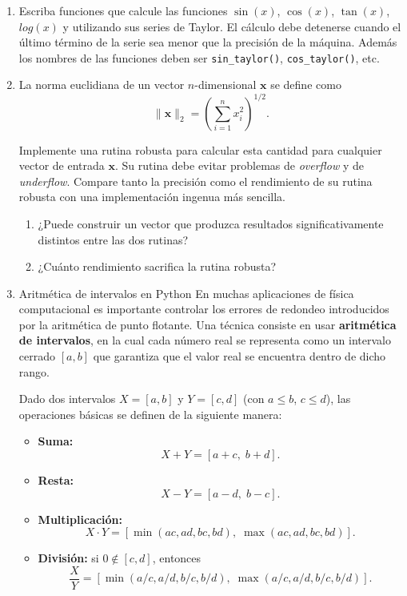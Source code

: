 \documentclass[12pt]{article}
\begin{document}
\begin{enumerate}[label=\textbf{\arabic*.}]
  \item   
  Escriba funciones que calcule las funciones $\sin(x)$, $\cos(x)$, $\tan(x)$, $log(x)$ y   utilizando sus series de Taylor.  
  El cálculo debe detenerse cuando el último término de la serie sea menor que la precisión de la máquina. Además los nombres de las funciones deben ser \texttt{sin\_taylor()}, \texttt{cos\_taylor()}, etc.

\item La norma euclidiana de un vector $n$-dimensional $\mathbf{x}$ se define como
\[
\|\mathbf{x}\|_2 = \left( \sum_{i=1}^{n} x_i^2 \right)^{1/2}.
\]

Implemente una rutina robusta para calcular esta cantidad para cualquier vector de entrada $\mathbf{x}$. 
Su rutina debe evitar problemas de \textit{overflow} y de \textit{underflow}. 
Compare tanto la precisión como el rendimiento de su rutina robusta con una implementación ingenua más sencilla. 

\begin{enumerate}
    \item ¿Puede construir un vector que produzca resultados significativamente distintos entre las dos rutinas? 
    \item ¿Cuánto rendimiento sacrifica la rutina robusta?
\end{enumerate}

\item Aritmética de intervalos en Python
En muchas aplicaciones de física computacional es importante controlar los errores de redondeo introducidos por la aritmética de punto flotante. Una técnica consiste en usar \textbf{aritmética de intervalos}, en la cual cada número real se representa como un intervalo cerrado $[a,b]$ que garantiza que el valor real se encuentra dentro de dicho rango.  


Dado dos intervalos $X = [a,b]$ y $Y = [c,d]$ (con $a\leq b$, $c\leq d$), las operaciones básicas se definen de la siguiente manera:

\begin{itemize}
    \item \textbf{Suma:}
    \[
    X+Y = [a+c,\; b+d].
    \]

    \item \textbf{Resta:}
    \[
    X-Y = [a-d,\; b-c].
    \]

    \item \textbf{Multiplicación:}
    \[
    X \cdot Y = [\min(ac,ad,bc,bd),\; \max(ac,ad,bc,bd)].
    \]

    \item \textbf{División:} si $0 \notin [c,d]$, entonces
    \[
    \frac{X}{Y} = [\min(a/c,a/d,b/c,b/d),\; \max(a/c,a/d,b/c,b/d)].
    \]
\end{itemize}


\end{enumerate}
\end{document}
